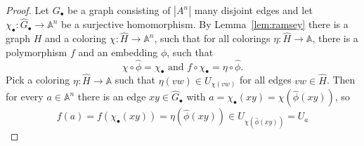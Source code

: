 \documentclass[oneside]{amsart}
\newcommand{\str}[1]{\mathbb{#1}}
\begin{document}
\mapFactory*


\begin{proof}
    Let $G_\bullet$ be a graph consisting of $|A^n|$ many disjoint edges and let $\chi_\bullet\colon\hat G_\bullet\to\str A^n$ be a surjective homomorphism. By Lemma~\ref{lem:ramsey} there is a graph $H$ and a coloring $\chi\colon\hat H\to\str A^n$, such that for all colorings $\eta\colon\hat H\to \str A$, there is a polymorphism $f$ and an embedding $\phi$, such that
    $$
    \chi\circ\hat\phi = \chi_\bullet
    \text{ and } 
    f\circ \chi_\bullet = \eta\circ\hat\phi.
    $$
    Pick a coloring $\eta\colon \hat H\to \str A$ such that $\eta(vw)\in U_{\chi(vw)}$ for all edges $vw\in\hat H$. Then for every $a\in\str A^n$ there is an edge $xy\in \hat G_\bullet$ with $a=\chi_\bullet(xy)=\chi(\hat\phi(xy))$, so
    $$
     f(a) = f(\chi_\bullet(xy)) = \eta(\hat\phi(xy))
     \in U_{\chi(\hat\phi(xy))} = U_a
    $$
\end{proof}

\lemRamsey*
\end{document}
